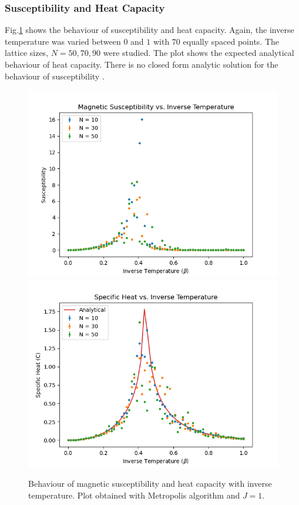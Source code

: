 \documentclass[%
reprint,
 amsmath,amssymb,
 aps,
]{revtex4-2}
\begin{document}
\subsubsection{Susceptibility and Heat Capacity}
 Fig.\ref{fig:metrocchi} shows the behaviour of susceptibility and heat capacity. Again, the inverse temperature was varied between $0$ and $1$ with $70$ equally spaced points. The lattice sizes, $N = 50, 70, 90$ were studied. The plot shows the expected analytical behaviour of heat capacity. There is no closed form analytic solution for the behaviour of susceptibility \cite{suscep}.
\begin{figure}[h!]
    \centering
    \includegraphics[width=\columnwidth]{metro_chi-beta.png}
    \includegraphics[width=\columnwidth]{metro_c-beta.png}
    \caption{Behaviour of magnetic susceptibility and heat capacity with inverse temperature. Plot obtained with Metropolis algorithm and $J=1$.}
    \label{fig:metrocchi}
\end{figure}
\end{document}
